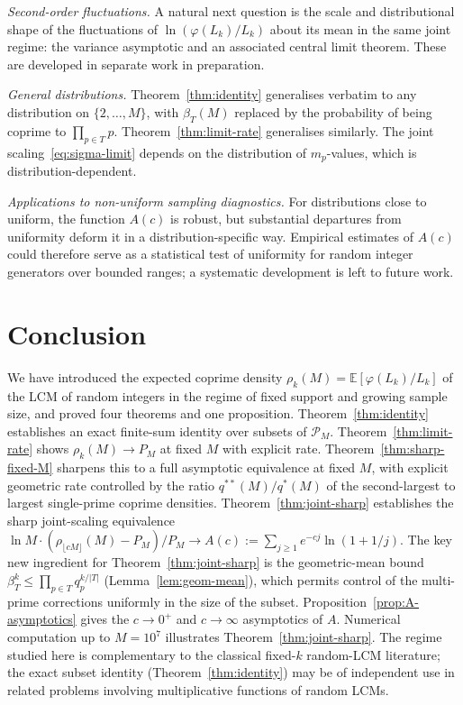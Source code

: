 \documentclass[11pt]{article}
\theoremstyle{remark}
\newcommand{\EE}{\mathbb{E}}
\newcommand{\PM}{\mathcal{P}_M}
\begin{document}
\emph{Second-order fluctuations.} A natural next question is the scale and distributional shape of the fluctuations of $\ln(\varphi(L_k)/L_k)$ about its mean in the same joint regime: the variance asymptotic and an associated central limit theorem. These are developed in separate work in preparation.

\emph{General distributions.} Theorem~\ref{thm:identity} generalises verbatim to any distribution on $\{2, \ldots, M\}$, with $\beta_T(M)$ replaced by the probability of being coprime to $\prod_{p \in T} p$. Theorem~\ref{thm:limit-rate} generalises similarly. The joint scaling~\eqref{eq:sigma-limit} depends on the distribution of $m_p$-values, which is distribution-dependent.

\emph{Applications to non-uniform sampling diagnostics.} For distributions close to uniform, the function $A(c)$ is robust, but substantial departures from uniformity deform it in a distribution-specific way. Empirical estimates of $A(c)$ could therefore serve as a statistical test of uniformity for random integer generators over bounded ranges; a systematic development is left to future work.

\section{Conclusion}\label{sec:conclusion}

We have introduced the expected coprime density $\rho_k(M) = \EE[\varphi(L_k)/L_k]$ of the LCM of random integers in the regime of fixed support and growing sample size, and proved four theorems and one proposition. Theorem~\ref{thm:identity} establishes an exact finite-sum identity over subsets of $\PM$. Theorem~\ref{thm:limit-rate} shows $\rho_k(M) \to P_M$ at fixed $M$ with explicit rate. Theorem~\ref{thm:sharp-fixed-M} sharpens this to a full asymptotic equivalence at fixed $M$, with explicit geometric rate controlled by the ratio $q^{**}(M)/q^*(M)$ of the second-largest to largest single-prime coprime densities. Theorem~\ref{thm:joint-sharp} establishes the sharp joint-scaling equivalence $\ln M \cdot (\rho_{\lfloor cM \rfloor}(M) - P_M)/P_M \to A(c) := \sum_{j \geq 1} e^{-cj} \ln(1 + 1/j)$. The key new ingredient for Theorem~\ref{thm:joint-sharp} is the geometric-mean bound $\beta_T^k \leq \prod_{p \in T} q_p^{k/|T|}$ (Lemma~\ref{lem:geom-mean}), which permits control of the multi-prime corrections uniformly in the size of the subset. Proposition~\ref{prop:A-asymptotics} gives the $c \to 0^+$ and $c \to \infty$ asymptotics of $A$. Numerical computation up to $M = 10^7$ illustrates Theorem~\ref{thm:joint-sharp}. The regime studied here is complementary to the classical fixed-$k$ random-LCM literature; the exact subset identity (Theorem~\ref{thm:identity}) may be of independent use in related problems involving multiplicative functions of random LCMs.
\end{document}
